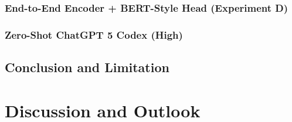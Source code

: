 \documentclass[12pt]{article}
\begin{document}
\subsubsection{End-to-End Encoder + BERT-Style Head (Experiment D)}
\subsubsection{Zero-Shot ChatGPT 5 Codex (High)}


\subsection{Conclusion and Limitation}

\section{Discussion and Outlook}

\end{document}
